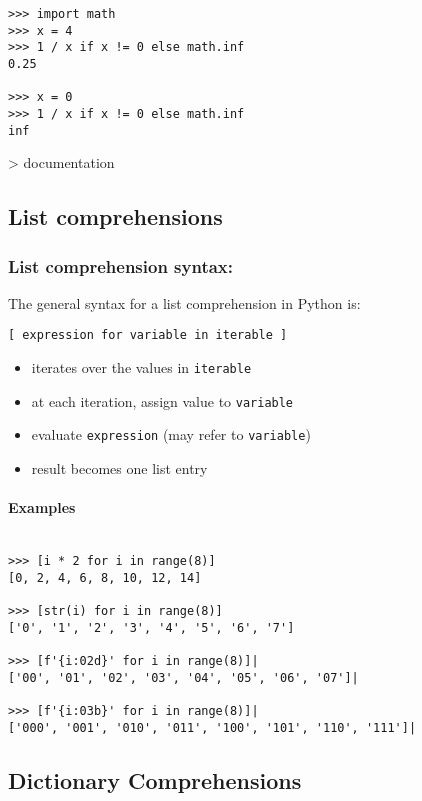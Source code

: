 \documentclass[12pt]{article}
\begin{document}
\begin{lstlisting}
>>> import math
>>> x = 4
>>> 1 / x if x != 0 else math.inf
0.25

>>> x = 0
>>> 1 / x if x != 0 else math.inf
inf
\end{lstlisting}

\textgreater{} documentation

\subsection{List comprehensions}

\subsubsection{List comprehension syntax:}
The general syntax for a list comprehension in Python is:
\begin{center}
\texttt{[ expression for variable in iterable ]}
\end{center}
\begin{itemize}
  \item iterates over the values in \texttt{iterable}
  \item at each iteration, assign value to \texttt{variable}
  \item evaluate \texttt{expression} (may refer to \texttt{variable})
  \item result becomes one list entry
\end{itemize}

\paragraph{Examples}

\begin{lstlisting}

>>> [i * 2 for i in range(8)]
[0, 2, 4, 6, 8, 10, 12, 14]

>>> [str(i) for i in range(8)]
['0', '1', '2', '3', '4', '5', '6', '7']

>>> [f'{i:02d}' for i in range(8)]|
['00', '01', '02', '03', '04', '05', '06', '07']|

>>> [f'{i:03b}' for i in range(8)]|
['000', '001', '010', '011', '100', '101', '110', '111']|
\end{lstlisting}


\subsection{Dictionary Comprehensions}
\end{document}
